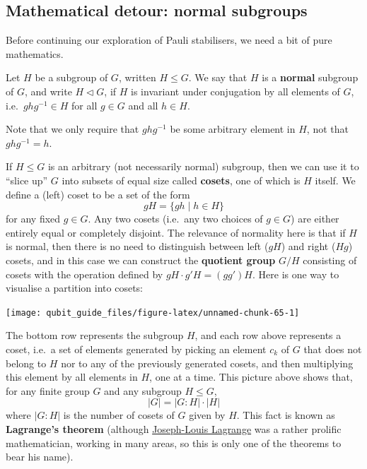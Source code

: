 \documentclass[fleqn,a4paper]{article}
\newenvironment{idea}{\everypar{\setlength{\parindent}{1.5em}}}{}
\theoremstyle{definition}
\theoremstyle{definition}
\theoremstyle{definition}
\theoremstyle{definition}
\theoremstyle{remark}
\begin{document}
\hypertarget{mathematical-detour-normal-subgroups}{%
\subsection{Mathematical detour: normal subgroups}\label{mathematical-detour-normal-subgroups}}

Before continuing our exploration of Pauli stabilisers, we need a bit of pure mathematics.

\begin{idea}
Let \(H\) be a subgroup of \(G\), written \(H\leqslant G\).
We say that \(H\) is a \textbf{normal} subgroup of \(G\), and write \(H\triangleleft G\), if \(H\) is invariant under conjugation by all elements of \(G\), i.e.~\(ghg^{-1}\in H\) for all \(g\in G\) and all \(h\in H\).

\end{idea}

Note that we only require that \(ghg^{-1}\) be some arbitrary element in \(H\), not that \(ghg^{-1}=h\).

If \(H\leqslant G\) is an arbitrary (not necessarily normal) subgroup, then we can use it to ``slice up'' \(G\) into subsets of equal size called \textbf{cosets}, one of which is \(H\) itself.
We define a (left) coset to be a set of the form
\[
  gH = \{gh \mid h\in H\}
\]
for any fixed \(g\in G\).
Any two cosets (i.e.~any two choices of \(g\in G\)) are either entirely equal or completely disjoint.
The relevance of normality here is that if \(H\) is normal, then there is no need to distinguish between left (\(gH\)) and right (\(Hg\)) cosets, and in this case we can construct the \textbf{quotient group} \(G/H\) consisting of cosets with the operation defined by \(gH\cdot g'H=(gg')H\).
Here is one way to visualise a partition into cosets:

\begin{center}\texttt{[image: qubit\_guide\_files/figure-latex/unnamed-chunk-65-1]} \end{center}

The bottom row represents the subgroup \(H\), and each row above represents a coset, i.e.~a set of elements generated by picking an element \(c_k\) of \(G\) that does not belong to \(H\) nor to any of the previously generated cosets, and then multiplying this element by all elements in \(H\), one at a time.
This picture above shows that, for any finite group \(G\) and any subgroup \(H\leqslant G\),
\[
  |G| = |G:H|\cdot|H|
\]
where \(|G:H|\) is the number of cosets of \(G\) given by \(H\).
This fact is known as \textbf{Lagrange's theorem} (although \href{https://en.wikipedia.org/wiki/Joseph-Louis_Lagrange}{Joseph-Louis Lagrange} was a rather prolific mathematician, working in many areas, so this is only one of the theorems to bear his name).
\end{document}
